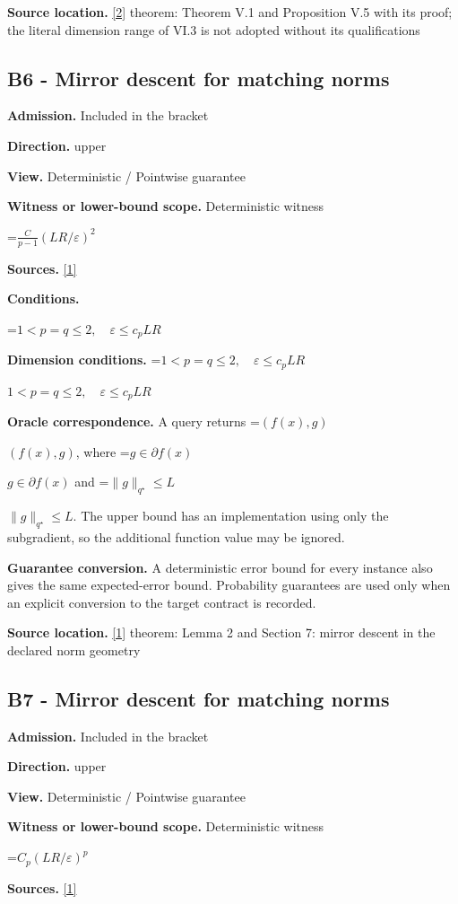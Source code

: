 \documentclass[10pt,a4paper]{article}
\newcommand{\AtlasMath}[1]{\par\begingroup\centering\setbox0=\hbox{$\displaystyle #1$}\ifdim\wd0>1.4\linewidth\typeout{ATLAS WIDE FORMULA: \the\wd0}\fi\ifdim\wd0>\linewidth\resizebox{\linewidth}{!}{\box0}\else\box0\fi\par\endgroup}
\newcommand{\AtlasInlineMath}[1]{\begingroup\setbox0=\hbox{$#1$}\ifdim\wd0>.4\linewidth\endgroup\AtlasMath{#1}\else\endgroup$#1$\fi}
\begin{document}
\textbf{Source location.} \href{https://arxiv.org/pdf/1407.5144}{[2]} theorem: Theorem V.1 and Proposition V.5 with its proof; the literal dimension range of VI.3 is not adopted without its qualifications

\subsection{B6 - Mirror descent for matching norms}
\textbf{Admission.} Included in the bracket

\textbf{Direction.} upper

\textbf{View.} Deterministic / Pointwise guarantee

\textbf{Witness or lower-bound scope.} Deterministic witness

\AtlasMath{\frac C{p-1}(LR/\varepsilon)^2}
\textbf{Sources.} \href{https://arxiv.org/pdf/1107.4080}{[1]}

\textbf{Conditions.} 
\AtlasMath{1<p=q\le2,\quad\varepsilon\le c_pLR}


\textbf{Dimension conditions.} \AtlasInlineMath{1<p=q\le2,\quad\varepsilon\le c_pLR}

\textbf{Oracle correspondence.} A query returns \AtlasInlineMath{(f(x),g)}, where \AtlasInlineMath{g\in\partial f(x)} and \AtlasInlineMath{\|g\|_{q^\star}\le L}. The upper bound has an implementation using only the subgradient, so the additional function value may be ignored.

\textbf{Guarantee conversion.} A deterministic error bound for every instance also gives the same expected-error bound. Probability guarantees are used only when an explicit conversion to the target contract is recorded.

\textbf{Source location.} \href{https://arxiv.org/pdf/1107.4080}{[1]} theorem: Lemma 2 and Section 7: mirror descent in the declared norm geometry

\subsection{B7 - Mirror descent for matching norms}
\textbf{Admission.} Included in the bracket

\textbf{Direction.} upper

\textbf{View.} Deterministic / Pointwise guarantee

\textbf{Witness or lower-bound scope.} Deterministic witness

\AtlasMath{C_p(LR/\varepsilon)^p}
\textbf{Sources.} \href{https://arxiv.org/pdf/1107.4080}{[1]}
\end{document}
